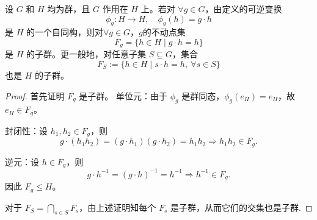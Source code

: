 \documentclass[../../main.tex]{subfiles}%
\begin{document}
\begin{proposition}\label{proposition:不动点子群}
设 \(G\) 和 \(H\) 均为群，且 \(G\) 作用在 \(H\) 上。若对 \(\forall g\in G\)，由定义的可逆变换
\[
\phi_g : H \to H,\quad \phi_g(h)=g\cdot h
\]
是 \(H\) 的一个自同构，则对\(\forall g\in G\)，$g$的不动点集
\[
F_g = \{ h\in H \mid g\cdot h = h \}
\]
是 \(H\) 的子群。更一般地，对任意子集 \(S\subseteq G\)，集合
\[
F_S := \{ h\in H \mid s\cdot h = h,\ \forall s\in S \}
\]
也是 \(H\) 的子群。
\end{proposition}
\begin{proof}

首先证明 \(F_g\) 是子群。
单位元：由于 \(\phi_g\) 是群同态，\(\phi_g(e_H)=e_H\)，故 \(e_H\in F_g\)。

封闭性：设 \(h_1,h_2\in F_g\)，则
\[
g\cdot(h_1h_2) = (g\cdot h_1)(g\cdot h_2) = h_1 h_2\Longrightarrow h_1h_2\in F_g.
\]

逆元：设 \(h\in F_g\)，则
\[
g\cdot h^{-1} = (g\cdot h)^{-1} = h^{-1}\Longrightarrow h^{-1}\in F_g.
\]
因此 \(F_g\leqslant H\)。

对于 \(F_S = \bigcap_{s\in S} F_s\)，由上述证明知每个 \(F_s\) 是子群，从而它们的交集也是子群.
\end{proof}
\end{document}
